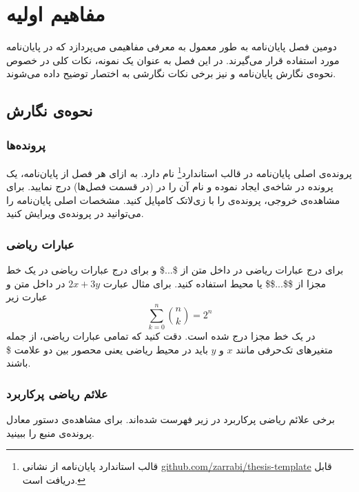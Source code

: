 
\chapter{مفاهیم اولیه}


دومین فصل پایان‌نامه به طور معمول به معرفی مفاهیمی می‌پردازد که در پایان‌نامه مورد استفاده قرار می‌گیرند.
در این فصل به عنوان یک نمونه، نکات کلی در خصوص نحوه‌ی نگارش پایان‌نامه
و نیز برخی نکات نگارشی به اختصار توضیح داده می‌شوند.

\section{نحوه‌ی نگارش}

\subsection{پرونده‌ها}

پرونده‌ی اصلی پایان‌نامه در قالب استاندارد\footnote{
قالب استاندارد پایان‌نامه از نشانی
\href{https://github.com/zarrabi/thesis-template}
{github.com/zarrabi/thesis-template}
قابل دریافت است.}
  نام دارد.
به ازای هر فصل از پایان‌نامه، یک پرونده در شاخه‌ی  ایجاد نموده
و نام آن را در   (در قسمت فصل‌ها) درج نمایید.
برای مشاهده‌ی خروجی، پرونده‌ی  را با زی‌لاتک کامپایل کنید.
مشخصات اصلی پایان‌نامه را می‌توانید در پرونده‌ی  ویرایش کنید.

\subsection{عبارات ریاضی}

برای درج عبارات ریاضی در داخل متن از \$...\$ و 
برای درج عبارات ریاضی در یک خط مجزا از \$\$...\$\$ یا محیط  
استفاده کنید. برای مثال عبارت 
$2x + 3y$
در داخل متن و عبارت زیر
\begin{equation}
\sum_{k=0}^{n} \binom{n}{k} = 2^n
\end{equation}
در یک خط مجزا درج شده است. 
دقت کنید که تمامی عبارات ریاضی، از جمله متغیرهای تک‌حرفی مانند $x$ و $y$ باید در محیط ریاضی 
یعنی محصور بین دو علامت \$ باشند. 


\subsection{علائم ریاضی پرکاربرد}

برخی علائم ریاضی پرکاربرد در زیر فهرست شده‌اند. 
برای مشاهده‌ی دستور  معادل پرونده‌ی منبع را ببینید.


